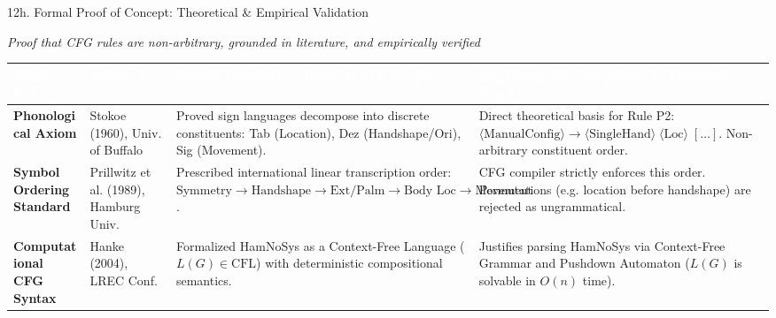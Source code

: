 \documentclass[aspectratio=169]{beamer}
\begin{document}
\begin{frame}[t]{12h. Formal Proof of Concept: Theoretical \& Empirical Validation}
\vspace{-0.1cm}
\begin{center}
    \scriptsize\textit{\textcolor{amritaMaroon}{Proof that CFG rules are non-arbitrary, grounded in literature, and empirically verified}}
\end{center}

\vspace{-1.5mm}
\centering
\setlength{\tabcolsep}{3pt}
\renewcommand{\arraystretch}{1.2}
{\fontsize{5.4pt}{6.8pt}\selectfont
\begin{tabular}{|>{\raggedright\arraybackslash\bfseries}p{1.8cm}|>{\raggedright\arraybackslash}p{2.3cm}|>{\raggedright\arraybackslash}p{4.8cm}|>{\raggedright\arraybackslash}p{4.7cm}|}
    \hline
    \rowcolor{maroon}
    \textcolor{white}{\textbf{Proof Pillar}} & 
    \textcolor{white}{\textbf{Author \& Source}} & 
    \textcolor{white}{\textbf{Formal Linguistic / Theoretical Principle}} & 
    \textcolor{white}{\textbf{SignBridge V2 Compliance \& Empirical Proof}} \\
    \hline
    \rowcolor{lightblue} 
    Phonological Axiom & 
    Stokoe (1960), Univ. of Buffalo & 
    Proved sign languages decompose into discrete constituents: Tab (Location), Dez (Handshape/Ori), Sig (Movement). & 
    Direct theoretical basis for Rule P2: $\langle\text{ManualConfig}\rangle \to \langle\text{SingleHand}\rangle \;\langle\text{Loc}\rangle \;[\dots]$. Non-arbitrary constituent order. \\
    \hline
    \rowcolor{lightgreen} 
    Symbol Ordering Standard & 
    Prillwitz et al. (1989), Hamburg Univ. & 
    Prescribed international linear transcription order: $\text{Symmetry} \to \text{Handshape} \to \text{Ext/Palm} \to \text{Body Loc} \to \text{Movement}$. & 
    CFG compiler strictly enforces this order. Permutations (e.g. location before handshape) are rejected as ungrammatical. \\
    \hline
    \rowcolor{lightyellow} 
    Computational CFG Syntax & 
    Hanke (2004), LREC Conf. & 
    Formalized HamNoSys as a Context-Free Language ($L(G) \in \text{CFL}$) with deterministic compositional semantics. & 
    Justifies parsing HamNoSys via Context-Free Grammar and Pushdown Automaton ($L(G)$ is solvable in $O(n)$ time). \\

\end{tabular}}
\end{frame}
\end{document}
